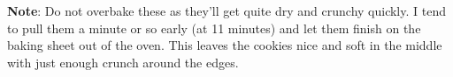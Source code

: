 \documentclass{article}
\begin{document}
\medskip

\textbf{Note}: Do not overbake these as they'll get quite dry and crunchy quickly. I tend to pull
them a minute or so early (at 11 minutes) and let them finish on the baking sheet out of the oven.
This leaves the cookies nice and soft in the middle with just enough crunch around the edges.

\end{document}
